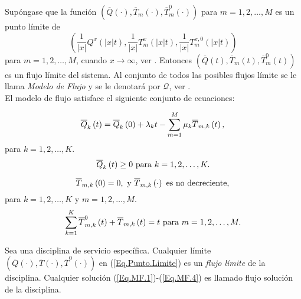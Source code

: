 Sup\'ongase que la funci\'on
$\left(\overline{Q}\left(\cdot\right),\overline{T}_{m}
\left(\cdot\right),\overline{T}_{m}^{0} \left(\cdot\right)\right)$
para $m=1,2,\ldots,M$ es un punto l\'imite de
\begin{equation}\label{Eq.Punto.Limite}
\left(\frac{1}{|x|}Q^{x}\left(|x|t\right),\frac{1}{|x|}T_{m}^{x}\left(|x|t\right),\frac{1}{|x|}T_{m}^{x,0}\left(|x|t\right)\right)
\end{equation}
para $m=1,2,\ldots,M$, cuando $x\rightarrow\infty$, ver
\cite{Down}. Entonces
$\left(\overline{Q}\left(t\right),\overline{T}_{m}
\left(t\right),\overline{T}_{m}^{0} \left(t\right)\right)$ es un
flujo l\'imite del sistema. Al conjunto de todos las posibles
flujos l\'imite se le llama {\emph{Modelo de Flujo}} y se le
denotar\'a por $\mathcal{Q}$, ver \cite{Down, Dai, DaiSean}.\\

El modelo de flujo satisface el siguiente conjunto de ecuaciones:

\begin{equation}\label{Eq.MF.1}
\overline{Q}_{k}\left(t\right)=\overline{Q}_{k}\left(0\right)+\lambda_{k}t-\sum_{m=1}^{M}\mu_{k}\overline{T}_{m,k}\left(t\right),\\
\end{equation}
para $k=1,2,\ldots,K$.\\
\begin{equation}\label{Eq.MF.2}
\overline{Q}_{k}\left(t\right)\geq0\textrm{ para
}k=1,2,\ldots,K.\\
\end{equation}

\begin{equation}\label{Eq.MF.3}
\overline{T}_{m,k}\left(0\right)=0,\textrm{ y }\overline{T}_{m,k}\left(\cdot\right)\textrm{ es no decreciente},\\
\end{equation}
para $k=1,2,\ldots,K$ y $m=1,2,\ldots,M$.\\
\begin{equation}\label{Eq.MF.4}
\sum_{k=1}^{K}\overline{T}_{m,k}^{0}\left(t\right)+\overline{T}_{m,k}\left(t\right)=t\textrm{
para }m=1,2,\ldots,M.\\
\end{equation}


\begin{Def}\label{Def.Modelo.Flujo}
Sea una disciplina de servicio espec\'ifica. Cualquier l\'imite
$\left(\overline{Q}\left(\cdot\right),\overline{T}\left(\cdot\right),\overline{T}^{0}\left(\cdot\right)\right)$
en (\ref{Eq.Punto.Limite}) es un {\em flujo l\'imite} de la
disciplina. Cualquier soluci\'on (\ref{Eq.MF.1})-(\ref{Eq.MF.4})
es llamado flujo soluci\'on de la disciplina.
\end{Def}

